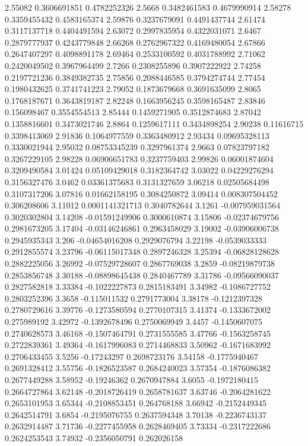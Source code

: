 {2.55082 0.3606691851 0.4782252326
2.5668 0.3482461583 0.4679990914
2.58278 0.3359455432 0.4583165374
2.59876 0.3237679091 0.4491437744
2.61474 0.3117137718 0.4404491594
2.63072 0.2997835954 0.4322031071
2.6467 0.2879777937 0.4243779848
2.66268 0.2762967322 0.4169480054
2.67866 0.2647407297 0.4098891178
2.69464 0.2533100592 0.4031788992
2.71062 0.2420049502 0.3967964499
2.7266 0.2308255896 0.3907222922
2.74258 0.2197721236 0.3849382735
2.75856 0.2088446585 0.3794274744
2.77454 0.1980432625 0.3741741223
2.79052 0.1873679668 0.3691635099
2.8065 0.1768187671 0.3643819187
2.82248 0.1663956245 0.3598165487
2.83846 0.156098467 0.3554554513
2.85444 0.1459271905 0.3512874683
2.87042 0.1358816601 0.3473021746
2.8864 0.1259617111 0.3434898254
2.90238 0.11616715 0.3398413069
2.91836 0.1064977559 0.3363480912
2.93434 0.09695328113 0.3330021944
2.95032 0.08753345239 0.3297961374
2.9663 0.07823797182 0.3267229105
2.98228 0.06906651783 0.3237759403
2.99826 0.06001874604 0.3209490584
3.01424 0.05109429018 0.3182364742
3.03022 0.04229276294 0.3156327476
3.0462 0.03361375683 0.3131327659
3.06218 0.02505684498 0.3107317206
3.07816 0.01662158195 0.3084250872
3.09414 0.008307504452 0.306208606
3.11012 0.0001141321713 0.3040782644
3.1261 -0.007959031564 0.3020302804
3.14208 -0.01591249906 0.3000610874
3.15806 -0.02374679756 0.2981673205
3.17404 -0.03146246861 0.2963458029
3.19002 -0.03906006738 0.2945935343
3.206 -0.04654016208 0.2929076794
3.22198 -0.0539033333 0.2912855574
3.23796 -0.06115017348 0.2897246328
3.25394 -0.06828128628 0.2882225056
3.26992 -0.07529728607 0.2867769038
3.2859 -0.08219879738 0.2853856748
3.30188 -0.08898645438 0.2840467789
3.31786 -0.09566090037 0.2827582818
3.33384 -0.1022227873 0.2815183491
3.34982 -0.1086727752 0.2803252396
3.3658 -0.115011532 0.2791773004
3.38178 -0.1212397328 0.2780729616
3.39776 -0.1273580594 0.2770107315
3.41374 -0.1333672002 0.275989192
3.42972 -0.1392678496 0.2750069949
3.4457 -0.1450607075 0.2740628573
3.46168 -0.1507464791 0.2731555585
3.47766 -0.1563258745 0.2722839361
3.49364 -0.1617996083 0.2714468833
3.50962 -0.1671683992 0.2706433455
3.5256 -0.17243297 0.2698723176
3.54158 -0.1775940467 0.2691328412
3.55756 -0.1826523587 0.2684240023
3.57354 -0.1876086382 0.2677449288
3.58952 -0.19246362 0.2670947884
3.6055 -0.1972180415 0.2664727864
3.62148 -0.2018726419 0.2658781637
3.63746 -0.2064281622 0.2653101953
3.65344 -0.2108853451 0.264768188
3.66942 -0.2152449345 0.2642514791
3.6854 -0.2195076755 0.2637594348
3.70138 -0.2236743137 0.2632914487
3.71736 -0.2277455958 0.2628469405
3.73334 -0.2317222686 0.2624253543
3.74932 -0.2356050791 0.262026158
}
